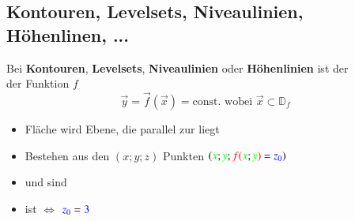 \subsection{Kontouren, Levelsets, Niveaulinien, Höhenlinen, ...}
Bei \textbf{Kontouren}, \textbf{Levelsets}, \textbf{Niveaulinien} oder \textbf{Höhenlinien} ist der  \\
der Funktion ${f}$ \\
$$\vec{y} = \vec{f}(\vec{x}) = \text{const. wobei } \vec{x} \subset \mathbb{D}_f$$



    \textbf{}
    \begin{itemize}
        \item Fläche wird  Ebene, die parallel zur  liegt
        \item Bestehen aus den $(x;y;z)$ Punkten $({\color{green}x} ; {\color{green}y} ; {\color{red}f(}{\color{green}x};{\color{green}y}{\color{red})} \text{ = } {\color{blue}z_0})$
        \item {} und  sind 
        \item {} ist  $\Leftrightarrow$ ${{\color{blue}z_0} = {\color{blue}3}}$
    \end{itemize} 


